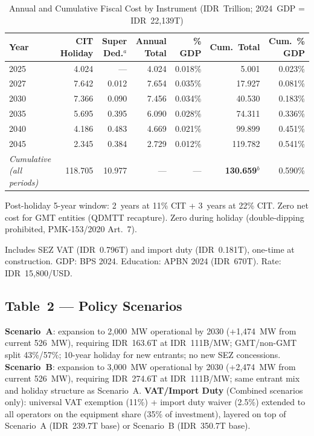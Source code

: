 \documentclass[11pt,english]{article}
\begin{document}
\begin{table}[H]
\centering
\caption{Annual and Cumulative Fiscal Cost by Instrument (IDR~Trillion; 2024~GDP = IDR~22{,}139T)}
\label{tab:timeline}
\begin{threeparttable}
\small
\begin{tabular}{l r r r r r r}
\toprule
\textbf{Year} & \textbf{CIT Holiday} & \textbf{Super Ded.$^{a}$} & \textbf{Annual Total} & \textbf{\% GDP} & \textbf{Cum.\ Total} & \textbf{Cum.\ \% GDP} \\
\midrule
  2025 & 4.024 & --- & 4.024 & 0.018\% & 5.001 & 0.023\% \\
  2027 & 7.642 & 0.012 & 7.654 & 0.035\% & 17.927 & 0.081\% \\
  2030 & 7.366 & 0.090 & 7.456 & 0.034\% & 40.530 & 0.183\% \\
  2035 & 5.695 & 0.395 & 6.090 & 0.028\% & 74.311 & 0.336\% \\
  2040 & 4.186 & 0.483 & 4.669 & 0.021\% & 99.899 & 0.451\% \\
  2045 & 2.345 & 0.384 & 2.729 & 0.012\% & 119.782 & 0.541\% \\
  \midrule
  \textit{Cumulative (all periods)} & 118.705 & 10.977 & --- & --- & \textbf{130.659}$^{b}$ & 0.590\% \\
\bottomrule
\end{tabular}
\begin{tablenotes}
\small
\item[$a$] Post-holiday 5-year window: 2~years at 11\% CIT + 3~years at 22\% CIT. Zero net cost for GMT entities (QDMTT recapture). Zero during holiday (double-dipping prohibited, PMK-153/2020 Art.~7).
\item[$b$] Includes SEZ VAT (IDR~0.796T) and import duty (IDR~0.181T), one-time at construction. GDP: BPS 2024. Education: APBN 2024 (IDR~670T). Rate: IDR~15{,}800/USD.
\end{tablenotes}
\end{threeparttable}
\end{table}
\subsection*{Table~2 \texorpdfstring{---}{--} Policy Scenarios}
\textbf{Scenario~A}: expansion to 2{,}000~MW operational by 2030 (+1{,}474~MW from current 526~MW), requiring IDR~163.6T at IDR~111B/MW; GMT/non-GMT split 43\%/57\%; 10-year holiday for new entrants; no new SEZ concessions. \textbf{Scenario~B}: expansion to 3{,}000~MW operational by 2030 (+2{,}474~MW from current 526~MW), requiring IDR~274.6T at IDR~111B/MW; same entrant mix and holiday structure as Scenario~A. \textbf{VAT/Import Duty} (Combined scenarios only): universal VAT exemption (11\%) + import duty waiver (2.5\%) extended to all operators on the equipment share (35\% of investment), layered on top of Scenario~A (IDR~239.7T base) or Scenario~B (IDR~350.7T base).
\end{document}

